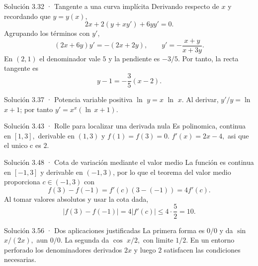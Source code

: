 \documentclass[10pt,a4paper,oneside,openany]{book}
\begin{document}
\begin{PSevenSolutionFixed}{Solución 3.32 · Tangente a una curva implícita}
Derivando respecto de \(x\) y recordando que \(y=y(x)\),
\[
2x+2(y+xy')+6yy'=0.
\]
Agrupando los términos con \(y'\),
\[
(2x+6y)y'=-(2x+2y),
\qquad
y'=-\frac{x+y}{x+3y}.
\]
En \((2,1)\) el denominador vale \(5\) y la pendiente es \(-3/5\). Por tanto, la recta tangente es
\[
y-1=-\frac35(x-2).
\]
\end{PSevenSolutionFixed}
\begin{PSevenSolutionFixed}{Solución 3.37 · Potencia variable positiva}
\(\ln\) \(y=x\) \(\ln\) \(x\). Al derivar, \(y'/y=\ln\) \(x+1\); por tanto \(y'=x^x(\ln\,x+1)\).
\end{PSevenSolutionFixed}
\begin{PSevenSolutionFixed}{Solución 3.43 · Rolle para localizar una derivada nula}
Es polinomica, continua en \([1,3],\) derivable en \((1,3)\) y \(f(1)=f(3)=0\). \(f'(x)=2x-4,\) asi que el unico c es \(2\).
\end{PSevenSolutionFixed}
\begin{PSevenSolutionFixed}{Solución 3.48 · Cota de variación mediante el valor medio}
La función es continua en \([-1,3]\) y derivable en \((-1,3)\), por lo que el teorema del valor medio proporciona \(c\in(-1,3)\) con
\[
f(3)-f(-1)=f'(c)(3-(-1))=4f'(c).
\]
Al tomar valores absolutos y usar la cota dada,
\[
|f(3)-f(-1)|=4|f'(c)|\le4\cdot\frac52=10.
\]
\end{PSevenSolutionFixed}
\begin{PSevenSolutionFixed}{Solución 3.56 · Dos aplicaciones justificadas}
La primera forma es \(0/0\) y da \(\sin\) \(x/(2x),\) aun \(0/0\). La segunda da \(\cos\) \(x/2,\) con limite \(1/2\). En un entorno perforado los denominadores derivados \(2x\) y luego \(2\) satisfacen las condiciones necesarias.
\end{PSevenSolutionFixed}
\end{document}
